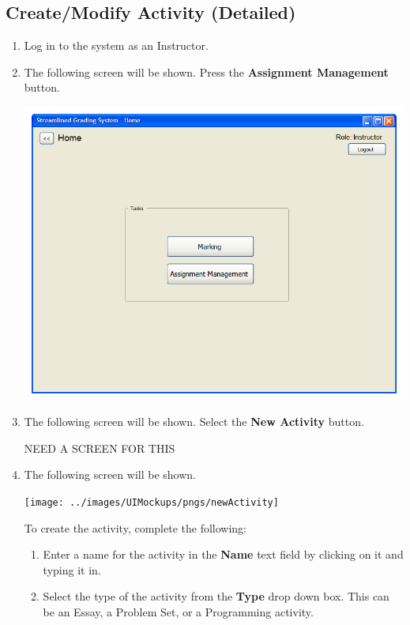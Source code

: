 \documentclass{article}
\begin{document}
\subsection{Create/Modify Activity (Detailed)}
\begin{enumerate}
  \item Log in to the system as an Instructor.
  \item The following screen will be shown.
    Press the \textbf{Assignment Management} button.
  \begin{center} 
   \includegraphics[scale=0.55]{../images/UIMockups/pngs/LandingPage}
  \end{center}
  \item The following screen will be shown. Select the \textbf{New Activity} button.
  \begin{center}
    NEED A SCREEN FOR THIS
  \end{center}
  \item The following screen will be shown.
   \begin{center} 
   \texttt{[image: ../images/UIMockups/pngs/newActivity]}
   \label{newActivity}
  \end{center}
  To create the activity, complete the following:
  \begin{enumerate}
  \item Enter a name for the activity in the \textbf{Name} text field by clicking on 
  it and typing it in.
  \item Select the type of the activity from the \textbf{Type} drop down box.
  This can be an Essay, a Problem Set, or a Programming activity.

\end{enumerate}
\end{enumerate}
\end{document}
